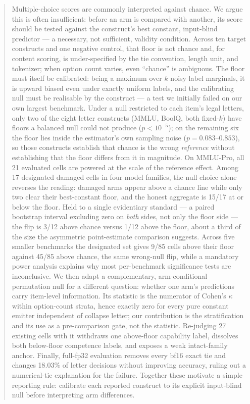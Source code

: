 \begin{abstract}
Multiple-choice scores are commonly interpreted against chance. We argue this is often insufficient: before an arm is compared with another, its score should be tested against the construct's best constant, input-blind predictor --- a necessary, not sufficient, validity condition. Across ten target constructs and one negative control, that floor is not chance and, for content scoring, is under-specified by the tie convention, length unit, and tokenizer; when option count varies, even ``chance'' is ambiguous. The floor must itself be calibrated: being a maximum over $k$ noisy label marginals, it is upward biased even under exactly uniform labels, and the calibrating null must be realisable by the construct --- a test we initially failed on our own largest benchmark. Under a null restricted to each item's legal letters, only two of the eight letter constructs (MMLU, BoolQ, both fixed-$k$) have floors a balanced null could not produce ($p<10^{-5}$); on the remaining six the floor lies inside the estimator's own sampling noise ($p=0.083$--$0.853$), so those constructs establish that chance is the wrong \emph{reference} without establishing that the floor differs from it in magnitude. On MMLU-Pro, all 21 evaluated cells are powered at the scale of the reference effect. Among 17 designated damaged cells in four model families, the null choice alone reverses the reading: damaged arms appear above a chance line while only two clear their best-constant floor, and the honest aggregate is 15/17 at or below the floor. Held to a single evidentiary standard --- a paired bootstrap interval excluding zero on \emph{both} sides, not only the floor side --- the flip is 3/12 above chance versus 1/12 above the floor, about a third of the size the asymmetric point-estimate comparison suggests. Across five smaller benchmarks the designated set gives 9/85 cells above their floor against 45/85 above chance, the same wrong-null flip, while a mandatory power analysis explains why most per-benchmark significance tests are inconclusive. We then adapt a complementary, arm-conditional permutation null for a different question: whether one arm's predictions carry item-level information. Its statistic is the numerator of Cohen's $\kappa$ within option-count strata, hence exactly zero for every pure constant emitter independent of collapse letter; our contribution is the stratification and its use as a pre-comparison gate, not the statistic. Re-judging 27 existing cells with it withdraws one above-floor capability label, dissolves both below-floor competence labels, and exposes a weak intact-family anchor. Finally, full-fp32 evaluation removes every bf16 exact tie and changes 18.03\% of letter decisions without improving accuracy, ruling out a numerical-tie explanation for the failure. Together these motivate a simple reporting rule: calibrate each reported construct to its explicit input-blind null before interpreting arm differences.
\end{abstract}
